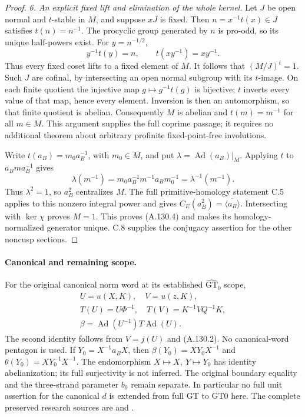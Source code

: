 \begin{proof}
\emph{6. An explicit fixed lift and elimination of the whole kernel.}
Let \(J\) be open normal and \(t\)-stable in \(M\), and suppose
\(xJ\) is fixed. Then \(n=x^{-1}t(x)\in J\) satisfies
\(t(n)=n^{-1}\). The procyclic group generated by \(n\) is
pro-odd, so its unique half-powers exist. For \(y=n^{-1/2}\),
\[
                    y^{-1}t(y)=n,\qquad
                    t(xy^{-1})=xy^{-1}.                     \tag{A.130.10}
\]
Thus every fixed coset lifts to a fixed element of \(M\).
It follows that \((M/J)^t=1\).
Such \(J\) are cofinal, by intersecting an open normal subgroup
with its \(t\)-image. On each finite quotient the injective
map \(g\mapsto g^{-1}t(g)\) is bijective; \(t\) inverts every
value of that map, hence every element. Inversion is then an
automorphism, so that finite quotient is abelian.
Consequently \(M\) is abelian and \(t(m)=m^{-1}\) for all
\(m\in M\). This argument supplies the full coprime passage;
it requires no additional theorem about arbitrary profinite
fixed-point-free involutions.

Write \(t(a_B)=m_0a_B^{-1}\), with \(m_0\in M\), and put
\(\lambda=\operatorname{Ad}(a_B)|_M\). Applying \(t\) to
\(a_Bma_B^{-1}\) gives
\[
 \lambda(m^{-1})
   =m_0a_B^{-1}m^{-1}a_Bm_0^{-1}
   =\lambda^{-1}(m^{-1}).
\]
Thus \(\lambda^2=1\), so \(a_B^2\) centralizes \(M\).
The full primitive-homology statement C.5 applies to this
nonzero integral power and gives
\(C_E(a_B^2)=\overline{\langle a_B\rangle}\).
Intersecting with \(\ker\chi\) proves \(M=1\).
This proves (A.130.4) and makes its homology-normalized
generator unique. C.8 supplies the conjugacy assertion for
the other noncusp sections.
\end{proof}

\paragraph{Canonical and remaining scope.}
For the original canonical norm word at its established
\(\widehat{\mathrm{GT}}_0\) scope,
\[
 \begin{gathered}
 U=u(X,K),\quad V=u(z,K),\\
 T(U)=U\Phi^{-1},\quad T(V)=K^{-1}VQ^{-1}K,\\
 \beta=\operatorname{Ad}(U^{-1})T\operatorname{Ad}(U).
 \end{gathered}
\]
The second identity follows from \(V=j(U)\) and (A.130.2).
No canonical-word pentagon is used. If
\(Y_0=X^{-1}a_BX\), then
\(\beta(Y_0)=XY_0X^{-1}\) and
\(\theta(Y_0)=XY_0^{-1}X^{-1}\).
The endomorphism \(X\mapsto X,\ Y\mapsto Y_0\) has identity
abelianization; its full surjectivity is not inferred.
The original boundary equality and the three-strand parameter
\(b_0\) remain separate. In particular no full unit assertion
for the canonical \(d\) is extended from full GT to GT0 here.
The complete preserved research sources are
 and
.
